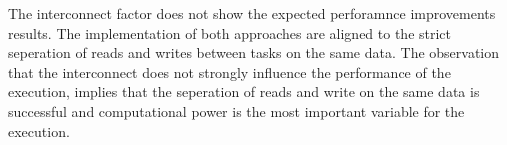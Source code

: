 The interconnect factor does not show the expected perforamnce improvements results. The implementation of both approaches are aligned to the strict seperation of reads and writes between tasks on the same data. The observation that the interconnect does not strongly influence the performance of the execution, implies that the seperation of reads and write on the same data is successful and computational power is the most important variable for the execution.



